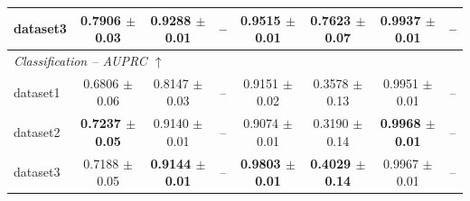 \begin{table}[p]
{\begin{tabular}{lccccccc}
dataset3
& \textbf{0.7906 $\pm$ 0.03}
& \textbf{0.9288 $\pm$ 0.01}
& --
& \textbf{0.9515 $\pm$ 0.01}
& \textbf{0.7623 $\pm$ 0.07}
& \textbf{0.9937 $\pm$ 0.01}
& -- \\
\midrule
\multicolumn{8}{l}{\textit{Classification -- AUPRC $\uparrow$}} \\
\midrule
dataset1
& 0.6806 $\pm$ 0.06
& 0.8147 $\pm$ 0.03
& --
& 0.9151 $\pm$ 0.02
& 0.3578 $\pm$ 0.13
& 0.9951 $\pm$ 0.01
& -- \\
dataset2
& \textbf{0.7237 $\pm$ 0.05}
& 0.9140 $\pm$ 0.01
& --
& 0.9074 $\pm$ 0.01
& 0.3190 $\pm$ 0.14
& \textbf{0.9968 $\pm$ 0.01}
& -- \\
dataset3
& 0.7188 $\pm$ 0.05
& \textbf{0.9144 $\pm$ 0.01}
& --
& \textbf{0.9803 $\pm$ 0.01}
& \textbf{0.4029 $\pm$ 0.14}
& 0.9967 $\pm$ 0.01
& -- \\
\bottomrule
\end{tabular}%
}
\end{table}
\clearpage
